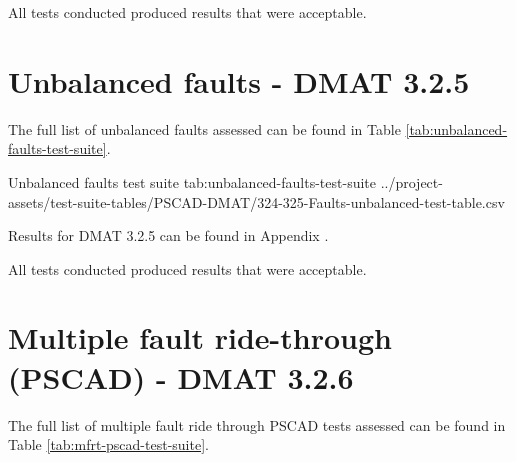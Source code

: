\documentclass{../grid-link-report}
\newcommand{\projectassetsdir}{../project-assets}
\begin{document}
	All tests conducted produced results that were acceptable.
	
	
	\section{Unbalanced faults - DMAT 3.2.5}
	\label{sec:unbalanced-faults}
	
	
	The full list of unbalanced faults assessed can be found in Table \ref{tab:unbalanced-faults-test-suite}.
	
	{
		\fontsize{5}{7}\selectfont
		\autoscaledlongtable
		{Unbalanced faults test suite}
		{tab:unbalanced-faults-test-suite}
		{\projectassetsdir/test-suite-tables/PSCAD-DMAT/324-325-Faults-unbalanced-test-table.csv}
	}
	
	Results for DMAT 3.2.5 can be found in Appendix .
	
	All tests conducted produced results that were acceptable.
	
	
	
	\section{Multiple fault ride-through (PSCAD) - DMAT 3.2.6}
	
	
	
	The full list of multiple fault ride through PSCAD tests assessed can be found in Table \ref{tab:mfrt-pscad-test-suite}.
	
\end{document}
